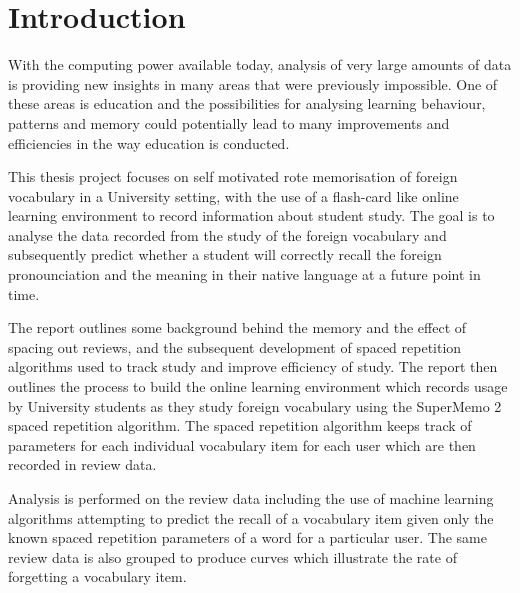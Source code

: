 \chapter*{Introduction}

With the computing power available today, analysis of very large amounts of data is providing
new insights in many areas that were previously impossible. One of these areas is
education and the possibilities for analysing learning behaviour, patterns and memory
could potentially lead to many improvements and efficiencies in the way education is conducted.

This thesis project focuses on self motivated rote memorisation of foreign vocabulary in
a University setting, with the use of a flash-card like online learning
environment to record information about student study. The goal is to analyse the data
recorded from the study of the foreign vocabulary and subsequently predict whether a student will
correctly recall the foreign pronounciation and the meaning in their native language
at a future point in time.

The report outlines some background behind the memory and the effect of spacing out reviews,
and the subsequent development of spaced repetition algorithms used to track study
and improve efficiency of study. The report then outlines the process to build the
online learning environment which records usage by University students as they
study foreign vocabulary using the SuperMemo 2 spaced repetition algorithm. The spaced
repetition algorithm keeps track of parameters for each individual vocabulary item for
each user which are then recorded in review data.

Analysis is performed on the review data including the use of machine learning algorithms
attempting to predict the recall of a vocabulary item given only the known spaced repetition parameters
of a word for a particular user. The same review data is also grouped to produce curves
which illustrate the rate of forgetting a vocabulary item.
